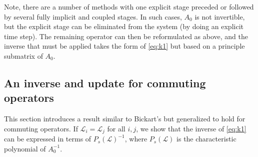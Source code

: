 \documentclass[review]{siamart}
\begin{document}
Note, there are a number of methods with one explicit stage preceded or followed by several
fully implicit and coupled stages. In such cases, $A_0$ is
not invertible, but the explicit stage can be eliminated from the system (by doing an explicit
time step). The remaining operator can then be reformulated as above, and the inverse that
must be applied takes the form of \eqref{eq:k1} but based on a principle submatrix of $A_0$.

\subsection{An inverse and update for commuting operators}\label{sec:solve:inv}

This section introduces a result similar to Bickart's but generalized to hold for commuting
operators. If $\mathcal{L}_i=\mathcal{L}_j$ for all $i,j$, we show that the inverse of
\eqref{eq:k1} can be expressed in terms of $P_s(\mathcal{L})^{-1}$, where $P_s(\mathcal{L})$
is the characteristic polynomial of $A_0^{-1}$.
\end{document}
